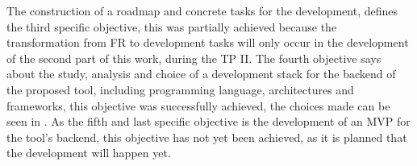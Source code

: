 
The construction of a roadmap and concrete tasks for the development, defines the third specific objective, this was partially achieved because the transformation from \ac{FR} to development tasks will only occur in the development of the second part of this work, during the \ac{TP} II.
The fourth objective says about the study, analysis and choice of a development stack for the backend of the proposed tool, including programming language, architectures and frameworks, this objective was successfully achieved, the choices made can be seen in .
As the fifth and last specific objective is the development of an \ac{MVP} for the tool's backend, this objective has not yet been achieved, as it is planned that the development will happen yet.

